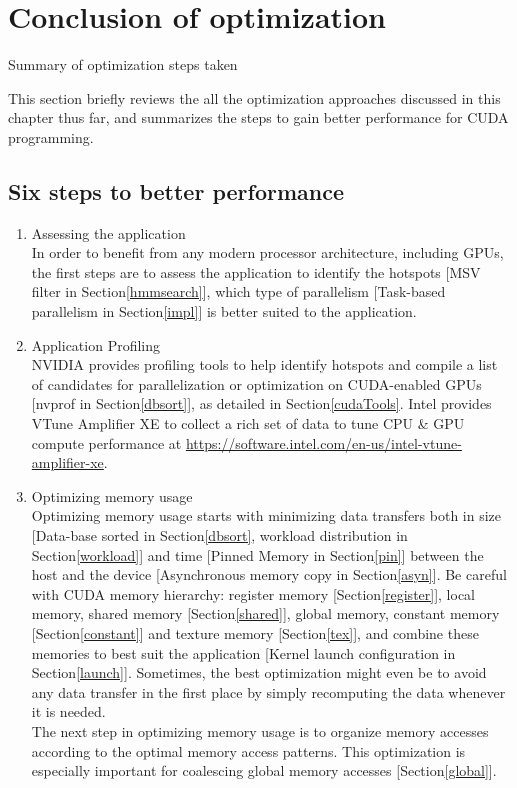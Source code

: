 
\section{Conclusion of optimization}
Summary of optimization steps taken

This section briefly reviews the all the optimization approaches discussed in this chapter thus far, and summarizes the steps to gain better performance for CUDA programming.

\subsection*{Six steps to better performance}
\begin{enumerate}
 \item Assessing the application\\
 In order to benefit from any modern processor architecture, including GPUs, the first steps are to assess the application to identify the hotspots [MSV filter in Section\ref{hmmsearch}], which type of parallelism [Task-based parallelism in Section\ref{impl}] is better suited to the application.
 \item Application Profiling\\
 NVIDIA provides profiling tools to help identify hotspots and compile a list of candidates for parallelization or optimization on CUDA-enabled GPUs [nvprof in Section\ref{dbsort}], as detailed in Section\ref{cudaTools}. 
 Intel provides VTune Amplifier XE to collect a rich set of data to tune CPU \& GPU compute performance at \url{https://software.intel.com/en-us/intel-vtune-amplifier-xe}.
 
 \item Optimizing memory usage\\
 Optimizing memory usage starts with minimizing data transfers both in size [Data-base sorted in Section\ref{dbsort}, workload distribution in Section\ref{workload}] and time [Pinned Memory in Section\ref{pin}] between the host and the device [Asynchronous memory copy in Section\ref{asyn}]. Be careful with CUDA memory hierarchy: register memory [Section\ref{register}], local memory, shared memory [Section\ref{shared}], global memory, constant memory [Section\ref{constant}] and texture memory [Section\ref{tex}], and combine these memories to best suit the application [Kernel launch configuration in Section\ref{launch}]. Sometimes, the best optimization might even be to avoid any data transfer in the first place by simply recomputing the data whenever it is needed.\\
 The next step in optimizing memory usage is to organize memory accesses according to the optimal memory access patterns. This optimization is especially important for coalescing global memory accesses [Section\ref{global}].
 

\end{enumerate}
